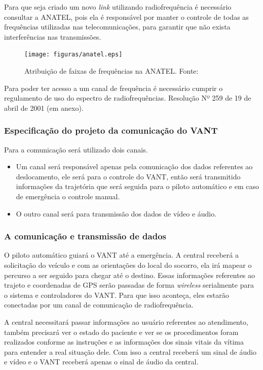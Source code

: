 Para que seja criado um novo \textit{link} utilizando radiofrequência é necessário consultar a ANATEL, pois ela é responsável por 
manter o controle de todas as frequências utilizadas nas telecomunicações, para garantir que não exista interferências nas transmissões.

\begin{figure}[H]
	\centering
	  \texttt{[image: figuras/anatel.eps]}
	\caption{Atribuição de faixas de frequências na ANATEL. Fonte: \cite{anatel}}
	\label{fig:tabela}
\end{figure}


Para poder ter acesso a um canal de frequência é necessário cumprir o regulamento de uso do espectro de radiofrequências. 
Resolução Nº 259 de 19 de abril de 2001 (em anexo).

\subsubsection{Especificação do projeto da comunicação do VANT}

Para a comunicação será utilizado dois canais.

\begin{itemize}
	\item Um canal será responsável apenas pela comunicação dos dados referentes ao deslocamento, ele será para o controle do VANT, então será transmitido informações da trajetória que será seguida para o piloto automático e em caso de emergência o controle manual.
	\item O outro canal será para transmissão dos dados de vídeo e áudio.
\end{itemize}

\subsubsection{A comunicação e transmissão de dados }

O piloto automático guiará o VANT até a emergência. A central receberá a solicitação do veículo e com as orientações do local do 
socorro, ela irá mapear o percurso a ser seguido para chegar até o destino.  Essas informações referentes ao trajeto e coordenadas de 
GPS serão passadas de forma \textit{wireless} serialmente para o sistema e controladores do VANT. Para que isso aconteça, eles estarão conectadas 
por um canal de comunicação de radiofrequência.

A central necessitará passar informações ao usuário referentes ao atendimento, também precisará ver o estado do paciente e ver se os 
procedimentos foram realizados conforme as instruções e as informações dos sinais vitais da vítima para entender a real situação dele. 
Com isso a central receberá um sinal de áudio e vídeo e o VANT receberá apenas o sinal de áudio da central. 

